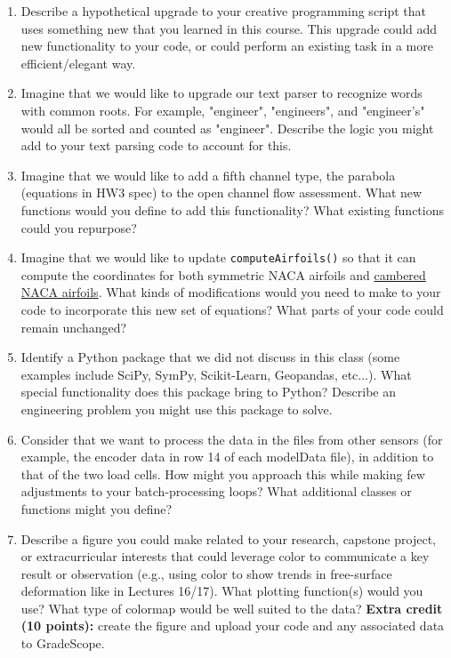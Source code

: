 \documentclass{homework}
\begin{document}
\begin{enumerate}[label=\textbf{Homework\,\arabic*.}, wide=0pt, leftmargin=*]
    \item Describe a hypothetical upgrade to your creative programming script that uses something new that you learned in this course. This upgrade could add new functionality to your code, or could perform an existing task in a more efficient/elegant way.
    
    \item Imagine that we would like to upgrade our text parser to recognize words with common roots. For example, "engineer", "engineers", and "engineer's" would all be sorted and counted as "engineer". Describe the logic you might add to your text parsing code to account for this.
    
    \item Imagine that we would like to add a fifth channel type, the parabola (equations in HW3 spec) to the open channel flow assessment. What new functions would you define to add this functionality? What existing functions could you repurpose?
    
    \item Imagine that we would like to update \texttt{computeAirfoils()} so that it can compute the coordinates for both symmetric NACA airfoils and \href{https://en.wikipedia.org/wiki/NACA_airfoil#Equation_for_a_cambered_4-digit_NACA_airfoil}{cambered NACA airfoils}. What kinds of modifications would you need to make to your code to incorporate this new set of equations? What parts of your code could remain unchanged?
    
    \item Identify a Python package that we did not discuss in this class (some examples include SciPy, SymPy, Scikit-Learn, Geopandas, etc...). What special functionality does this package bring to Python? Describe an engineering problem you might use this package to solve.
    
    \item Consider that we want to process the data in the files from other sensors (for example, the encoder data in row 14 of each modelData file), in addition to that of the two load cells. How might you approach this while making few adjustments to your batch-processing loops? What additional classes or functions might you define?
    
    \item Describe a figure you could make related to your research, capstone project, or extracurricular interests that could leverage color to communicate a key result or observation (e.g., using color to show trends in free-surface deformation like in Lectures 16/17). What plotting function(s) would you use? What type of colormap would be well suited to the data? \textbf{Extra credit (10 points):} create the figure and upload your code and any associated data to GradeScope.
\end{enumerate}
\end{document}
